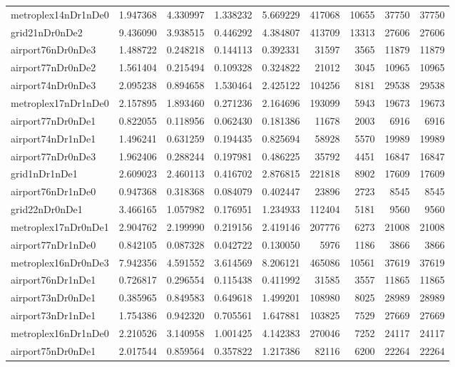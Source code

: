 \begin{longtable}{|l|r|r|r|r|r|r|r|r|}
metroplex14nDr1nDe0 & 1.947368 & 4.330997 & 1.338232 & 5.669229 & 417068 & 10655 & 37750 & 37750 \\
grid21nDr0nDe2 & 9.436090 & 3.938515 & 0.446292 & 4.384807 & 413709 & 13313 & 27606 & 27606 \\
airport76nDr0nDe3 & 1.488722 & 0.248218 & 0.144113 & 0.392331 & 31597 & 3565 & 11879 & 11879 \\
airport77nDr0nDe2 & 1.561404 & 0.215494 & 0.109328 & 0.324822 & 21012 & 3045 & 10965 & 10965 \\
airport74nDr0nDe3 & 2.095238 & 0.894658 & 1.530464 & 2.425122 & 104256 & 8181 & 29538 & 29538 \\
metroplex17nDr1nDe0 & 2.157895 & 1.893460 & 0.271236 & 2.164696 & 193099 & 5943 & 19673 & 19673 \\
airport77nDr0nDe1 & 0.822055 & 0.118956 & 0.062430 & 0.181386 & 11678 & 2003 & 6916 & 6916 \\
airport74nDr1nDe1 & 1.496241 & 0.631259 & 0.194435 & 0.825694 & 58928 & 5570 & 19989 & 19989 \\
airport77nDr0nDe3 & 1.962406 & 0.288244 & 0.197981 & 0.486225 & 35792 & 4451 & 16847 & 16847 \\
grid1nDr1nDe1 & 2.609023 & 2.460113 & 0.416702 & 2.876815 & 221818 & 8902 & 17609 & 17609 \\
airport76nDr1nDe0 & 0.947368 & 0.318368 & 0.084079 & 0.402447 & 23896 & 2723 & 8545 & 8545 \\
grid22nDr0nDe1 & 3.466165 & 1.057982 & 0.176951 & 1.234933 & 112404 & 5181 & 9560 & 9560 \\
metroplex17nDr0nDe1 & 2.904762 & 2.199990 & 0.219156 & 2.419146 & 207776 & 6273 & 21008 & 21008 \\
airport77nDr1nDe0 & 0.842105 & 0.087328 & 0.042722 & 0.130050 & 5976 & 1186 & 3866 & 3866 \\
metroplex16nDr0nDe3 & 7.942356 & 4.591552 & 3.614569 & 8.206121 & 465086 & 10561 & 37619 & 37619 \\
airport76nDr1nDe1 & 0.726817 & 0.296554 & 0.115438 & 0.411992 & 31585 & 3557 & 11865 & 11865 \\
airport73nDr0nDe1 & 0.385965 & 0.849583 & 0.649618 & 1.499201 & 108980 & 8025 & 28989 & 28989 \\
airport73nDr1nDe1 & 1.754386 & 0.942320 & 0.705561 & 1.647881 & 103825 & 7529 & 27669 & 27669 \\
metroplex16nDr1nDe0 & 2.210526 & 3.140958 & 1.001425 & 4.142383 & 270046 & 7252 & 24117 & 24117 \\
airport75nDr0nDe1 & 2.017544 & 0.859564 & 0.357822 & 1.217386 & 82116 & 6200 & 22264 & 22264 \\

\end{longtable}
